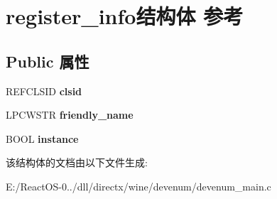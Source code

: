 \hypertarget{structregister__info}{}\section{register\+\_\+info结构体 参考}
\label{structregister__info}
\subsection*{Public 属性}
\begin{DoxyCompactItemize}
\item 
\mbox{\label{structregister__info_a128c4c182130a6098b78529b7d52930d}} 
R\+E\+F\+C\+L\+S\+ID {\bfseries clsid}
\item 
\mbox{\label{structregister__info_a44573bf2e2f35890bf9856b39b32f900}} 
L\+P\+C\+W\+S\+TR {\bfseries friendly\+\_\+name}
\item 
\mbox{\label{structregister__info_a647cb1df694927429799e4a25b15f0fb}} 
B\+O\+OL {\bfseries instance}
\end{DoxyCompactItemize}


该结构体的文档由以下文件生成\+:\begin{DoxyCompactItemize}
\item 
E\+:/\+React\+O\+S-\/0../dll/directx/wine/devenum/devenum\+\_\+main.\+c\end{DoxyCompactItemize}
